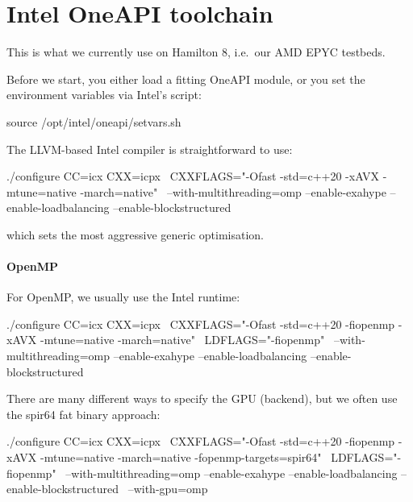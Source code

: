 % 
% 
% 




\section{Intel OneAPI toolchain}

\begin{remark}
 This is what we currently use on Hamilton 8, i.e.~our AMD EPYC testbeds.
\end{remark}


\noindent
Before we start, you either load a fitting OneAPI module, or you set the
environment variables via Intel's script:

\begin{bash}
source /opt/intel/oneapi/setvars.sh
\end{bash}

\noindent
The LLVM-based Intel compiler is straightforward to use:

\begin{bash}
./configure CC=icx CXX=icpx \
 CXXFLAGS="-Ofast -std=c++20 -xAVX -mtune=native -march=native" \ 
 --with-multithreading=omp --enable-exahype --enable-loadbalancing --enable-blockstructured
\end{bash}

\noindent
which sets the most aggressive generic optimisation.



\paragraph{OpenMP}

For OpenMP, we usually use the Intel runtime:

\begin{bash}
./configure CC=icx CXX=icpx \
 CXXFLAGS="-Ofast -std=c++20 -fiopenmp -xAVX -mtune=native -march=native" \
 LDFLAGS="-fiopenmp" \
 --with-multithreading=omp --enable-exahype --enable-loadbalancing --enable-blockstructured
\end{bash}

\noindent
There are many different ways to specify the GPU (backend), but we often use the
spir64 fat binary approach:


\begin{bash}
./configure CC=icx CXX=icpx \
 CXXFLAGS="-Ofast -std=c++20 -fiopenmp -xAVX -mtune=native -march=native -fopenmp-targets=spir64" \
 LDFLAGS="-fiopenmp" \
 --with-multithreading=omp --enable-exahype --enable-loadbalancing --enable-blockstructured \
 --with-gpu=omp
\end{bash}



